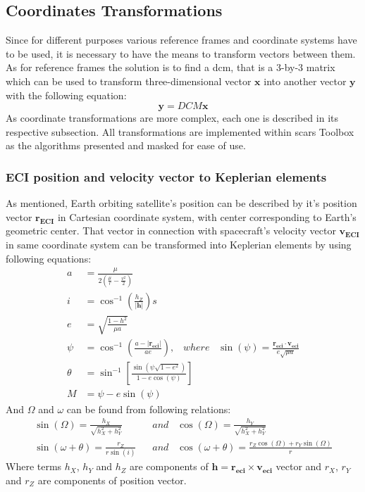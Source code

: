 \subsection{Coordinates Transformations}
    Since for different purposes various reference frames and coordinate systems have to be used, it is necessary to have the means to transform vectors between them. As for reference frames the solution is to find a \ac{dcm}, that is a 3-by-3 matrix which can be used to transform three-dimensional vector $\textbf{x}$ into another vector $\textbf{y}$ with the following equation:
    \begin{equation}
        \textbf{y} = DCM\textbf{x}
    \end{equation}
    As coordinate transformations are more complex, each one is described in its respective subsection. All transformations are implemented within \ac{scars} Toolbox as the algorithms presented and masked for ease of use.
    
    \subsubsection{ECI position and velocity vector to Keplerian elements}
        As mentioned, Earth orbiting satellite's position can be described by it's position vector $\textbf{r}_{\textbf{ECI}}$ in Cartesian coordinate system, with center corresponding to Earth's geometric center. That vector in connection with spacecraft's velocity vector $\textbf{v}_{\textbf{ECI}}$ in same coordinate system can be transformed into Keplerian elements by using following equations:
        \begin{align}
            a &= \frac{\mu}{2\left(\frac{\mu}{r}-\frac{v^2}{2}\right)} \\
            i &= \cos^{-1}\left(\frac{h_Z}{|\textbf{h}|}\right)s \\
            e &= \sqrt{ \frac{1-h^2}{\mu a} } \\
            \psi &= \cos^{-1}\left(\frac{a-|\textbf{r}_{\textbf{eci}}|}{ae}\right), \;\;\; where \;\;\; \sin(\psi) = \frac{\textbf{r}_{\textbf{eci}}\cdot\textbf{v}_{\textbf{eci}}}{e\sqrt{\mu a}} \\
            \theta &= \sin^{-1}\left[\frac{\sin(\psi \sqrt{1-e^2})}{1-e\cos(\psi)}\right] \\
            M & = \psi - e\sin(\psi)
        \end{align}
        And $\Omega$ and $\omega$ can be found from following relations:
        \begin{align}
            \sin(\Omega) = \frac{h_X}{\sqrt{h^2_X+h^2_Y}}\;\;\; & and\;\;\; \cos(\Omega) = \frac{h_Y}{\sqrt{h^2_X+h^2_Y}} \\
            \sin(\omega+\theta) = \frac{r_Z}{r\sin(i)}\;\;\; & and\;\;\; \cos(\omega+\theta) = \frac{r_Z\cos(\Omega)+r_Y\sin(\Omega)}{r}
        \end{align}
        Where terms $h_X$, $h_Y$ and $h_Z$ are components of $\textbf{h}=\textbf{r}_{\textbf{eci}}\times \textbf{v}_{\textbf{eci}}$ vector and $r_X$, $r_Y$ and $r_Z$ are components of position vector.
    
